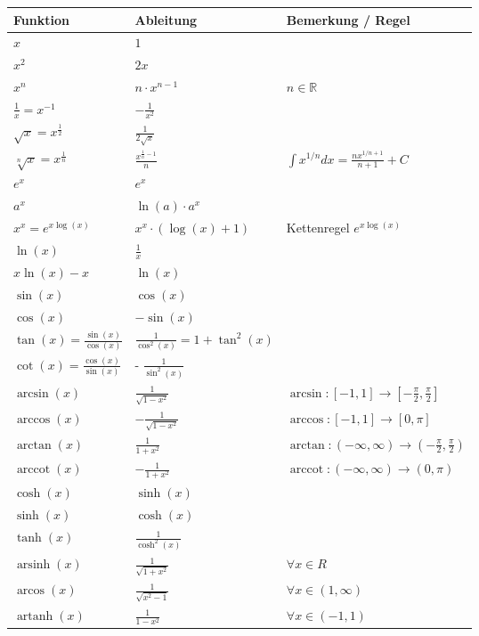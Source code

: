 \documentclass[25pt]{sciposter}
\newcommand{\R}{\mathbb{R}}
\begin{document}
\begin{multicols}{3}
{\renewcommand{\arraystretch}{1.5}
	\begin{table}[]
		\begin{tabular}{@{} p{} p{} p{} @{}}
			\toprule
			Funktion & Ableitung & Bemerkung / Regel\\ \midrule
			$x$ & $1$ &   \\
			$x^2$& $2x$ &   \\
			$x^n$& $n\cdot x^{n-1}$ & $n \in \R$  \\
			$\frac{1}{x} = x^{-1}$ & $- \frac{1}{x^2}$ & \\
			$\sqrt{x} = x^{\frac{1}{2}}$ & $\frac{1}{2\sqrt{x}}$ & \\ 
			$\sqrt[n]{x} = x^{\frac{1}{n}}$ & $\frac{x^{\frac{1}{n} -1 }}{n}$ &  $\int x^{1/n} dx = \frac{n x^{1/n + 1}}{n+1} + C$\\ 
			$e^x$ & $e^x$ & \\
			$a^x$ & $\ln(a) \cdot a^x$& \\
			$x^x = e^{x\log(x)}$ & $x^x \cdot (\log(x) + 1)$ & Kettenregel $e^{x\log(x)}$\\
			$\ln(x)$ & $\frac{1}{x}$ & \\
			$x\ln(x) - x$ & $\ln(x)$ &  \\ \midrule
			$\sin(x)$ & $\cos(x)$ & \\
			$\cos(x)$ & $- \sin(x)$ & \\ 
			$\tan(x) = \frac{\sin(x)}{\cos(x)}$ & $\frac{1}{\cos^2(x)} = 1 + \tan^2(x)$ &\\
			$\cot(x) = \frac{\cos(x)}{\sin(x)}$ & - $\frac{1}{\sin^2(x)}$ & \\ 
			$\arcsin(x)$ & $\frac{1}{\sqrt{1 - x^2}}$ & $ \arcsin : [-1,1] \to [-\frac{\pi}{2},\frac{\pi}{2}]$\\
			$\arccos(x)$ & $ - \frac{1}{\sqrt{1-x^2}}$ & $\arccos : [-1,1] \to [0, \pi]$\\
			$\arctan(x)$ & $\frac{1}{1+x^2}$ & $\arctan:(-\infty, \infty) \to (- \frac{\pi}{2},\frac{\pi}{2})$\\
			$\operatorname{arccot}(x)$ & $ - \frac{1}{1+x^2} $ & $\operatorname{arccot} : (-\infty, \infty) \to (0,\pi)$\\
			\midrule
			$\cosh(x)$ & $\sinh(x)$ &\\
			$\sinh(x)$ & $\cosh(x)$ & \\
			$\tanh(x)$ & $\frac{1}{\cosh^2(x)}$ & \\
			$\operatorname{arsinh}(x)$ & $\frac{1}{\sqrt{1+x^2}}$ & $\forall x \in R$\\
			$\operatorname{arcos}(x)$ & $\frac{1}{\sqrt{x^2 - 1}}$ & $\forall x \in (1, \infty)$\\		  $\operatorname{artanh}(x)$ & $\frac{1}{1-x^2}$ & $\forall x \in (-1,1)$\\

\end{tabular}
\end{table}}
\end{multicols}
\end{document}
